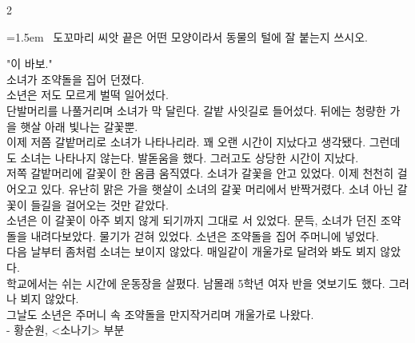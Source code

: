 \documentclass[11pt, a4paper]{article}
\begin{document}
\begin{multicols}{2}
\noindent\begin{minipage}{\columnwidth}
\vspace{2mm}
{\hangindent=1.5em  ~도꼬마리 씨앗 끝은 어떤 모양이라서 동물의 털에 잘 붙는지 쓰시오.\par}

\vspace{3mm}
\noindent\hrulefill
\vspace{2.5mm}
\noindent\hrulefill
\vspace{2.5mm}
\noindent\hrulefill
\vspace{2.5mm}
\noindent\hrulefill
\vspace{2.5mm}
\noindent\hrulefill
\vspace{2.5mm}
\vspace{1mm}
\vspace{4mm}
\end{minipage}
\par


\vspace{1mm}
\vspace{0.5mm}

\begin{passagebox}
\noindent{}"이 바보." \\
소녀가 조약돌을 집어 던졌다. \\
소년은 저도 모르게 벌떡 일어섰다. \\
단발머리를 나풀거리며 소녀가 막 달린다. 갈밭 사잇길로 들어섰다. 뒤에는 청량한 가을 햇살 아래 빛나는 갈꽃뿐. \\
이제 저쯤 갈밭머리로 소녀가 나타나리라. 꽤 오랜 시간이 지났다고 생각됐다. 그런데도 소녀는 나타나지 않는다. 발돋움을 했다. 그러고도 상당한 시간이 지났다. \\
저쪽 갈밭머리에 갈꽃이 한 옴큼 움직였다. 소녀가 갈꽃을 안고 있었다. 이제 천천히 걸어오고 있다. 유난히 맑은 가을 햇살이 소녀의 갈꽃 머리에서 반짝거렸다. 소녀 아닌 갈꽃이 들길을 걸어오는 것만 같았다. \\
소년은 이 갈꽃이 아주 뵈지 않게 되기까지 그대로 서 있었다. 문득, 소녀가 던진 조약돌을 내려다보았다. 물기가 걷혀 있었다. 소년은 조약돌을 집어 주머니에 넣었다.
\\[0.5em]
다음 날부터 좀처럼 소녀는 보이지 않았다. 매일같이 개울가로 달려와 봐도 뵈지 않았다. \\
학교에서는 쉬는 시간에 운동장을 살폈다. 남몰래 5학년 여자 반을 엿보기도 했다. 그러나 뵈지 않았다. \\
그날도 소년은 주머니 속 조약돌을 만지작거리며 개울가로 나왔다.
\\[0.5em]
- 황순원, <소나기> 부분
\end{passagebox}
\vspace{1mm}


\end{multicols}
\end{document}
